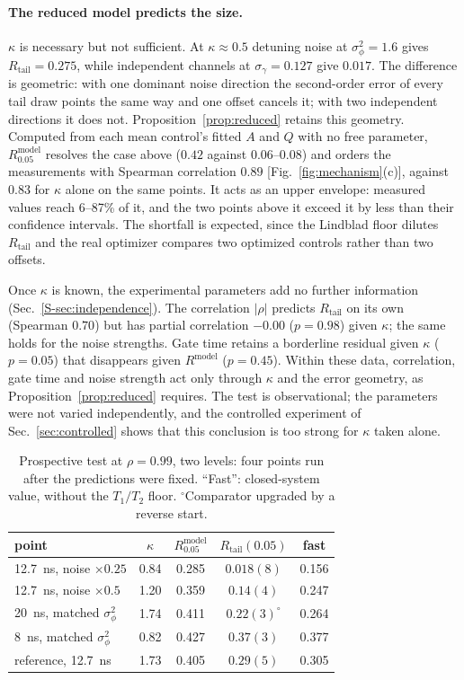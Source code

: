 \documentclass[aps,pra,twocolumn,superscriptaddress,reprint,nofootinbib,floatfix]{revtex4-2}
\theoremstyle{definition}
\newcommand{\Rt}{R_{\mathrm{tail}}}
\newcommand{\Rm}{R^{\mathrm{model}}}
\newcommand{\sref}[1]{Sec.~\ref{S-#1}}
\begin{document}
\paragraph*{The reduced model predicts the size.} $\kappa$ is necessary but
not sufficient. At $\kappa\approx0.5$ detuning noise at
$\sigma_\phi^2=1.6$ gives $\Rt=0.275$, while independent channels at
$\sigma_\gamma=0.127$ give $0.017$. The difference is geometric: with one
dominant noise direction the second-order error of every tail draw points the
same way and one offset cancels it; with two independent directions it does
not. Proposition~\ref{prop:reduced} retains this geometry. Computed from each
mean control's fitted $A$ and $Q$ with no free parameter, $\Rm_{0.05}$
resolves the case above ($0.42$ against $0.06$--$0.08$) and orders the
measurements with Spearman correlation $0.89$ [Fig.~\ref{fig:mechanism}(c)],
against $0.83$ for $\kappa$ alone on the same points. It acts as an upper
envelope: measured values reach 6--87\% of it, and the two points above it
exceed it by less than their confidence intervals. The shortfall is expected,
since the Lindblad floor dilutes $\Rt$ and the real optimizer compares two
optimized controls rather than two offsets.

Once $\kappa$ is known, the experimental parameters add no further
information (\sref{sec:independence}). The correlation $|\rho|$ predicts
$\Rt$ on its own (Spearman $0.70$) but has partial correlation $-0.00$
($p=0.98$) given $\kappa$; the same holds for the noise strengths. Gate time
retains a borderline residual given $\kappa$ ($p=0.05$) that disappears given
$\Rm$ ($p=0.45$). Within these data, correlation, gate time and noise strength
act only through $\kappa$ and the error geometry, as
Proposition~\ref{prop:reduced} requires. The test is observational; the
parameters were not varied independently, and the controlled experiment of
Sec.~\ref{sec:controlled} shows that this conclusion is too strong for
$\kappa$ taken alone.

\begin{table}[b]
\caption{Prospective test at $\rho=0.99$, two levels: four points run after
the predictions were fixed. ``Fast'': closed-system value, without the
$T_1/T_2$ floor. $^{\circ}$Comparator upgraded by a reverse start.}
\label{tab:prospective}
\begin{ruledtabular}
\begin{tabular}{lcccc}
point & $\kappa$ & $\Rm_{0.05}$ & $\Rt(0.05)$ & fast\\
\hline
12.7~ns, noise $\times0.25$ & 0.84 & 0.285 & $0.018(8)$ & 0.156\\
12.7~ns, noise $\times0.5$ & 1.20 & 0.359 & $0.14(4)$ & 0.247\\
20~ns, matched $\sigma_\phi^2$ & 1.74 & 0.411 & $0.22(3)^{\circ}$ & 0.264\\
8~ns, matched $\sigma_\phi^2$ & 0.82 & 0.427 & $0.37(3)$ & 0.377\\
\hline
reference, 12.7~ns & 1.73 & 0.405 & $0.29(5)$ & 0.305\\
\end{tabular}
\end{ruledtabular}
\end{table}
\end{document}
